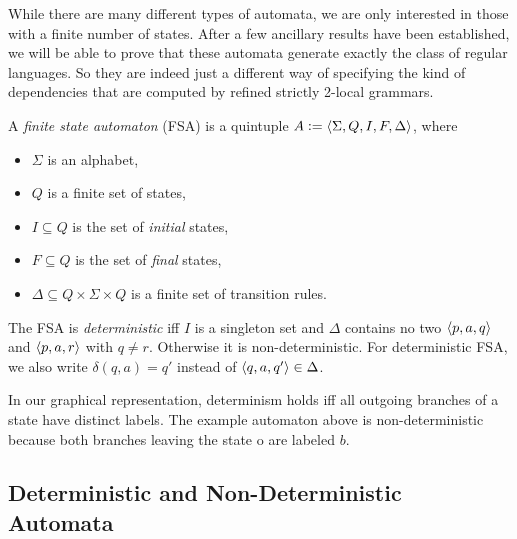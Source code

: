 While there are many different types of automata, we are only interested in those with a finite number of states.
After a few ancillary results have been established, we will be able to prove that these automata generate exactly the class of regular languages.
So they are indeed just a different way of specifying the kind of dependencies that are computed by refined strictly 2-local grammars.
%
\begin{definition}
    A \emph{finite state automaton} (FSA) is a quintuple $A \mathrel{\mathop:}= \left \langle \Sigma, Q, I, F, \Delta \right \rangle $, where
    \begin{itemize}
        \item $\Sigma$ is an alphabet,
        \item $Q$ is a finite set of states,
        \item $I \subseteq Q$ is the set of \emph{initial} states,
        \item $F \subseteq Q$ is the set of \emph{final} states,
        \item $\Delta \subseteq Q \times \Sigma \times Q$ is a finite set of transition rules.
    \end{itemize}
    The FSA is \emph{deterministic} iff $I$ is a singleton set and $\Delta$ contains no two $\left \langle p,a,q \right \rangle $ and $\left \langle p,a,r \right \rangle $ with $q \neq r$.
    Otherwise it is non-deterministic.
    For deterministic FSA, we also write $\delta(q,a) = q'$ instead of $\left \langle q,a,q' \right \rangle  \in \Delta$.
\end{definition}
%
In our graphical representation, determinism holds iff all outgoing branches of a state have distinct labels.
The example automaton above is non-deterministic because both branches leaving the state o are labeled $b$.

\subsection{Deterministic and Non-Deterministic Automata}

